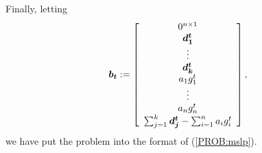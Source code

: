 Finally, letting
\begin{equation*}
\mathbf{\boldsymbol{b_t}} := \left[
\begin{array}{c}
	0^{n\times 1}\\
	\mathbf{\boldsymbol{d_1^t}}\\
	\vdots\\
	\mathbf{\boldsymbol{d_k^t}}\\
	a_1 g_1^t\\
	\vdots\\
	a_n g_n^t\\
	\sum_{j=1}^k \mathbf{\boldsymbol{d_j^t}} - \sum_{i=1}^{n} a_i g_i^t
\end{array}
\right],
\end{equation*}
we have put the problem into the format of (\ref{PROB:mslp}).%
